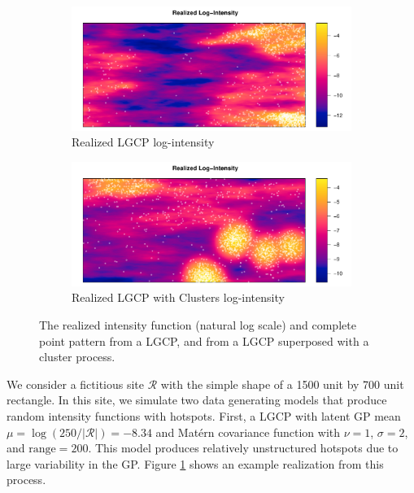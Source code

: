 \documentclass[review]{elsarticle}
\begin{document}
\begin{figure}

\begin{subfigure}{5in}
\includegraphics[width=5in]{../graphics/lambda-LGCP000004.pdf}
\caption{Realized LGCP log-intensity}
\label{lambdalgcp}
\end{subfigure}

\begin{subfigure}{5in}
\includegraphics[width=5in]{../graphics/lambda-Cluster000004.pdf}
\caption{Realized LGCP with Clusters log-intensity}
\label{lambdacluster}
\end{subfigure}

\caption{The realized intensity function (natural log scale) and complete
point pattern from a LGCP, and from a LGCP superposed with a cluster process.}
\label{fulldata}
\end{figure}

We consider a fictitious site \(\mathcal{R}\) with the simple shape of a 1500
unit by 700 unit rectangle. In this site, we simulate two data generating
models that produce random intensity functions with hotspots. First, a LGCP
with latent GP mean \(\mu = \log(250 / |\mathcal{R}|) = -8.34\) and
Mat\'{e}rn covariance function with \(\nu = 1\), \(\sigma = 2\), and
\(\text{range} = 200\). This model produces relatively unstructured hotspots
due to large variability in the GP. Figure \ref{lambdalgcp} shows an example
realization from this process.
\end{document}

